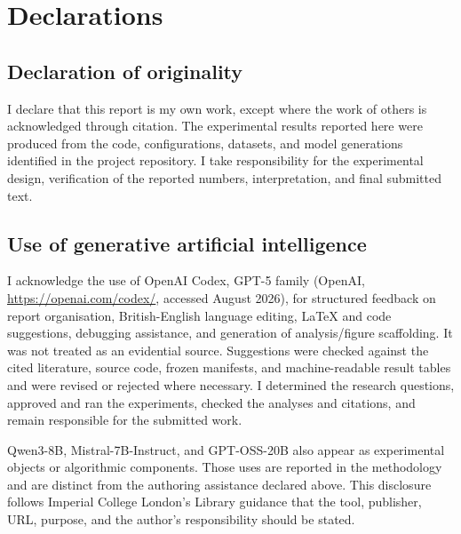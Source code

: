 \documentclass[11pt,twoside,a4paper]{report}
\begin{document}

\clearpage
{}
{}
\renewcommand{\bibname}{References}



\clearpage
\chapter*{Declarations}

\section*{Declaration of originality}

I declare that this report is my own work, except where the work of others is
acknowledged through citation.  The experimental results reported here were produced
from the code, configurations, datasets, and model generations identified in the
project repository.  I take responsibility for the experimental design, verification
of the reported numbers, interpretation, and final submitted text.

\section*{Use of generative artificial intelligence}

I acknowledge the use of OpenAI Codex, GPT-5 family (OpenAI,
\url{https://openai.com/codex/}, accessed August 2026), for structured feedback on
report organisation, British-English language editing, LaTeX and code suggestions,
debugging assistance, and generation of analysis/figure scaffolding.  It was not
treated as an evidential source.  Suggestions were checked against the cited
literature, source code, frozen manifests, and machine-readable result tables and
were revised or rejected where necessary.  I determined the research questions,
approved and ran the experiments, checked the analyses and citations, and remain
responsible for the submitted work.

Qwen3-8B, Mistral-7B-Instruct, and GPT-OSS-20B also appear as experimental objects or
algorithmic components.  Those uses are reported in the methodology and are distinct
from the authoring assistance declared above.  This disclosure follows Imperial
College London's Library guidance that the tool, publisher, URL, purpose, and the
author's responsibility should be stated.
\end{document}
